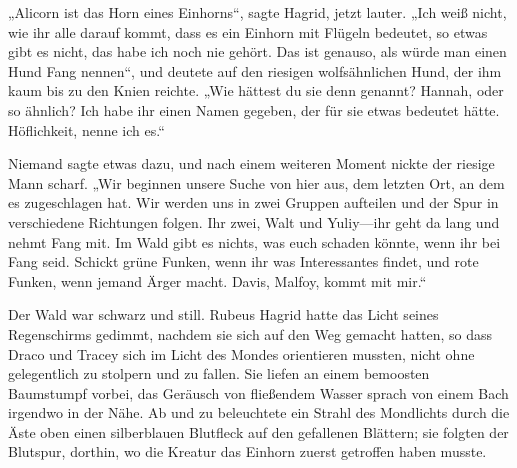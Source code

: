 „Alicorn ist das Horn eines Einhorns“, sagte Hagrid, jetzt lauter. „Ich weiß nicht, wie ihr alle darauf kommt, dass es ein Einhorn mit Flügeln bedeutet, so etwas gibt es nicht, das habe ich noch nie gehört. Das ist genauso, als würde man einen Hund Fang nennen“, und deutete auf den riesigen wolfsähnlichen Hund, der ihm kaum bis zu den Knien reichte. „Wie hättest du sie denn genannt? Hannah, oder so ähnlich? Ich habe ihr einen Namen gegeben, der für sie etwas bedeutet hätte. Höflichkeit, nenne ich es.“

Niemand sagte etwas dazu, und nach einem weiteren Moment nickte der riesige Mann scharf. „Wir beginnen unsere Suche von hier aus, dem letzten Ort, an dem es zugeschlagen hat. Wir werden uns in zwei Gruppen aufteilen und der Spur in verschiedene Richtungen folgen. Ihr zwei, Walt und Yuliy—ihr geht da lang und nehmt Fang mit. Im Wald gibt es nichts, was euch schaden könnte, wenn ihr bei Fang seid. Schickt grüne Funken, wenn ihr was Interessantes findet, und rote Funken, wenn jemand Ärger macht. Davis, Malfoy, kommt mit mir.“

Der Wald war schwarz und still. Rubeus Hagrid hatte das Licht seines Regenschirms gedimmt, nachdem sie sich auf den Weg gemacht hatten, so dass Draco und Tracey sich im Licht des Mondes orientieren mussten, nicht ohne gelegentlich zu stolpern und zu fallen. Sie liefen an einem bemoosten Baumstumpf vorbei, das Geräusch von fließendem Wasser sprach von einem Bach irgendwo in der Nähe. Ab und zu beleuchtete ein Strahl des Mondlichts durch die Äste oben einen silberblauen Blutfleck auf den gefallenen Blättern; sie folgten der Blutspur, dorthin, wo die Kreatur das Einhorn zuerst getroffen haben musste.

